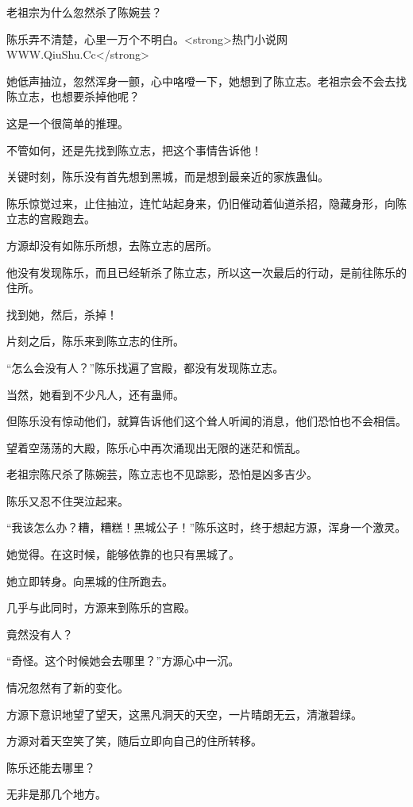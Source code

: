 
\begin{this_body}

老祖宗为什么忽然杀了陈婉芸？

陈乐弄不清楚，心里一万个不明白。<strong>热门小说网WWW.QiuShu.Cc</strong>

她低声抽泣，忽然浑身一颤，心中咯噔一下，她想到了陈立志。老祖宗会不会去找陈立志，也想要杀掉他呢？

这是一个很简单的推理。

不管如何，还是先找到陈立志，把这个事情告诉他！

关键时刻，陈乐没有首先想到黑城，而是想到最亲近的家族蛊仙。

陈乐惊觉过来，止住抽泣，连忙站起身来，仍旧催动着仙道杀招，隐藏身形，向陈立志的宫殿跑去。

方源却没有如陈乐所想，去陈立志的居所。

他没有发现陈乐，而且已经斩杀了陈立志，所以这一次最后的行动，是前往陈乐的住所。

找到她，然后，杀掉！

片刻之后，陈乐来到陈立志的住所。

“怎么会没有人？”陈乐找遍了宫殿，都没有发现陈立志。

当然，她看到不少凡人，还有蛊师。

但陈乐没有惊动他们，就算告诉他们这个耸人听闻的消息，他们恐怕也不会相信。

望着空荡荡的大殿，陈乐心中再次涌现出无限的迷茫和慌乱。

老祖宗陈尺杀了陈婉芸，陈立志也不见踪影，恐怕是凶多吉少。

陈乐又忍不住哭泣起来。

“我该怎么办？糟，糟糕！黑城公子！”陈乐这时，终于想起方源，浑身一个激灵。

她觉得。在这时候，能够依靠的也只有黑城了。

她立即转身。向黑城的住所跑去。

几乎与此同时，方源来到陈乐的宫殿。

竟然没有人？

“奇怪。这个时候她会去哪里？”方源心中一沉。

情况忽然有了新的变化。

方源下意识地望了望天，这黑凡洞天的天空，一片晴朗无云，清澈碧绿。

方源对着天空笑了笑，随后立即向自己的住所转移。

陈乐还能去哪里？

无非是那几个地方。


\end{this_body}
